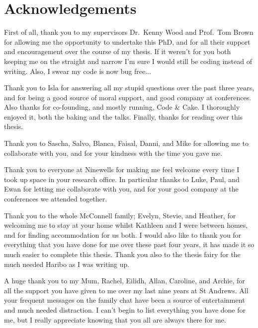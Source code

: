 \documentclass[10pt,a4paper,twoside]{book}
\begin{document}


\chapter{Acknowledgements}
First of all, thank you to my supervisors Dr.~Kenny Wood and Prof.~Tom Brown for allowing me the opportunity to undertake this PhD, and for all their support and encouragement over the course of my thesis.
If it weren't for you both keeping me on the straight and narrow I'm sure I would still be coding instead of writing.
Also, I swear my code is now bug free...
\medskip


Thank you to Isla for answering all my stupid questions over the past three years, and for being a good source of moral support, and good company at conferences.
Also thanks for co-founding, and mostly running, Code \& Cake. I thoroughly enjoyed it, both the baking and the talks.
Finally, thanks for reading over this thesis.
\medskip

Thank you to Sascha, Salvo, Blanca, Faisal, Danni, and Mike for allowing me to collaborate with you, and for your kindness with the time you gave me.
\medskip

Thank you to everyone at Ninewells for making me feel welcome every time I took up space in your research office.
In particular thanks to Luke, Paul, and Ewan for letting me collaborate with you, and for your good company at the conferences we attended together.
\medskip

Thank you to the whole McConnell family; Evelyn, Stevie, and Heather, for welcoming me to stay at your home whilst Kathleen and I were between homes, and for finding accommodation for us both.
I would also like to thank you for everything that you have done for me over these past four years, it has made it so much easier to complete this thesis.
Thank you also to the thesis fairy for the much needed Haribo as I was writing up.
\medskip

A huge thank you to my Mum, Rachel, Eilidh, Allan, Caroline, and Archie, for all the support you have given to me over my last nine years at St Andrews.
All your frequent messages on the family chat have been a source of entertainment and much needed distraction.
I can't begin to list everything you have done for me, but I really appreciate knowing that you all are always there for me.
\medskip
\end{document}
